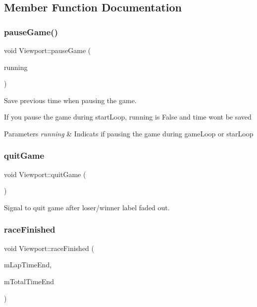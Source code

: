 \subsection{Member Function Documentation}
\mbox{\label{class_viewport_a154be67b66998968a60df76042438b4b}} 
\subsubsection{\texorpdfstring{pauseGame()}{pauseGame()}}
{\footnotesize\ttfamily void Viewport\+::pause\+Game (\begin{DoxyParamCaption}\item[{bool}]{running }\end{DoxyParamCaption})}



Save previous time when pausing the game. 

If you pause the game during start\+Loop, running is False and time won\textquotesingle{}t be saved 
\begin{DoxyParams}{Parameters}
{\em running} & Indicats if pausing the game during game\+Loop or star\+Loop \\
\hline
\end{DoxyParams}
\mbox{\label{class_viewport_a6381ca87ee7069368f5c14e544814292}} 
\subsubsection{\texorpdfstring{quitGame}{quitGame}}
{\footnotesize\ttfamily void Viewport\+::quit\+Game (\begin{DoxyParamCaption}{ }\end{DoxyParamCaption})\hspace{0.3cm}{\ttfamily [signal]}}



Signal to quit game after loser/winner label faded out. 

\mbox{\label{class_viewport_ade60c881ba4012c6a0fad5fbea967981}} 
\subsubsection{\texorpdfstring{raceFinished}{raceFinished}}
{\footnotesize\ttfamily void Viewport\+::race\+Finished (\begin{DoxyParamCaption}\item[{Q\+String $\ast$}]{m\+Lap\+Time\+End,  }\item[{Q\+String}]{m\+Total\+Time\+End }\end{DoxyParamCaption})\hspace{0.3cm}{\ttfamily [signal]}}



